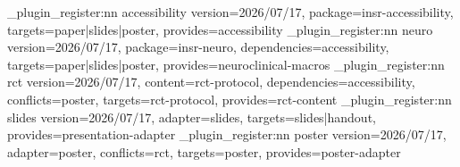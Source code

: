 \insr_plugin_register:nn { accessibility } { version=2026/07/17, package=insr-accessibility, targets=paper|slides|poster, provides=accessibility }
\insr_plugin_register:nn { neuro } { version=2026/07/17, package=insr-neuro, dependencies=accessibility, targets=paper|slides|poster, provides=neuroclinical-macros }
\insr_plugin_register:nn { rct } { version=2026/07/17, content=rct-protocol, dependencies=accessibility, conflicts=poster, targets=rct-protocol, provides=rct-content }
\insr_plugin_register:nn { slides } { version=2026/07/17, adapter=slides, targets=slides|handout, provides=presentation-adapter }
\insr_plugin_register:nn { poster } { version=2026/07/17, adapter=poster, conflicts=rct, targets=poster, provides=poster-adapter }
